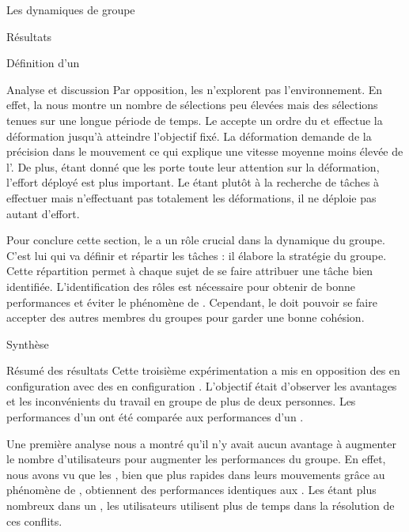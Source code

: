 \documentclass[myfrancais]{mythesis}
\begin{document}
\begin{mychapter}{Les dynamiques de groupe}
\begin{mysection}{Résultats}
\begin{mysubsection}{Définition d'un }
\begin{mysubsubsection}{Analyse et discussion}
					Par opposition, les  n'explorent pas l'environnement.
					En effet, la  nous montre un nombre de sélections peu élevées mais des sélections tenues sur une longue période de temps.
					Le  accepte un ordre du  et effectue la déformation jusqu'à atteindre l'objectif fixé.
					La déformation demande de la précision dans le mouvement ce qui explique une vitesse moyenne moins élevée de l'.
					De plus, étant donné que les  porte toute leur attention sur la déformation, l'effort déployé est plus important.
					Le  étant plutôt à la recherche de tâches à effectuer mais n'effectuant pas totalement les déformations, il ne déploie pas autant d'effort.

					Pour conclure cette section, le  a un rôle crucial dans la dynamique du groupe.
					C'est lui qui va définir et répartir les tâches : il élabore la stratégie du groupe.
					Cette répartition permet à chaque sujet de se faire attribuer une tâche bien identifiée.
					L'identification des rôles est nécessaire pour obtenir de bonne performances et éviter le phénomène de  .
					Cependant, le  doit pouvoir se faire accepter des autres membres du groupes pour garder une bonne cohésion.
				\end{mysubsubsection}
			\end{mysubsection}
		\end{mysection}
		\begin{mysection}{Synthèse}
			\begin{mysubsection}{Résumé des résultats}
				Cette troisième expérimentation a mis en opposition des  en configuration  avec des  en configuration .
				L'objectif était d'observer les avantages et les inconvénients du travail en groupe de plus de deux personnes.
				Les performances d'un  ont été comparée aux performances d'un .

				Une première analyse nous a montré qu'il n'y avait aucun avantage à augmenter le nombre d'utilisateurs pour augmenter les performances du groupe.
				En effet, nous avons vu que les , bien que plus rapides dans leurs mouvements grâce au phénomène de , obtiennent des performances identiques aux .
				Les  étant plus nombreux dans un , les utilisateurs utilisent plus de temps dans la résolution de ces conflits.


\end{mysubsection}
\end{mysection}
\end{mychapter}
\end{document}
